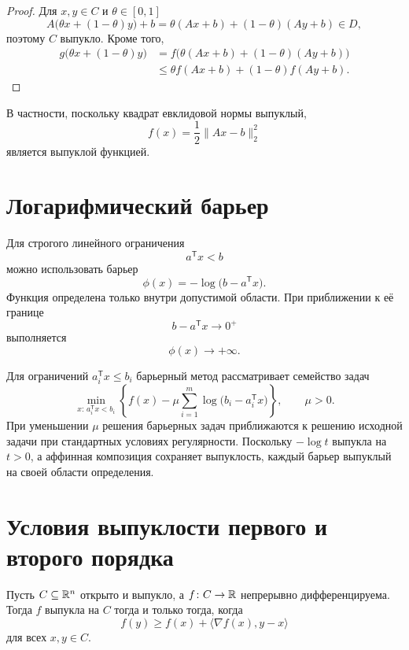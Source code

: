 \begin{proof}
Для \(x,y\in C\) и \(\theta\in[0,1]\)
\[
    A\bigl(\theta x+(1-\theta)y\bigr)+b
    =
    \theta(Ax+b)+(1-\theta)(Ay+b)\in D,
\]
поэтому \(C\) выпукло. Кроме того,
\[
\begin{aligned}
    g\bigl(\theta x+(1-\theta)y\bigr)
    &=
    f\bigl(
        \theta(Ax+b)+(1-\theta)(Ay+b)
    \bigr)
    \\
    &\le
    \theta f(Ax+b)+(1-\theta)f(Ay+b).
\end{aligned}
\]
\end{proof}

В частности, поскольку квадрат евклидовой нормы выпуклый,
\[
    f(x)=\frac12\lVert Ax-b\rVert_2^2
\]
является выпуклой функцией.

\section{Логарифмический барьер}

Для строгого линейного ограничения
\[
    a^{\mathsf T}x<b
\]
можно использовать барьер
\[
    \phi(x)
    =
    -\log\bigl(b-a^{\mathsf T}x\bigr).
\]
Функция определена только внутри допустимой области. При приближении
к её границе
\[
    b-a^{\mathsf T}x\to0^+
\]
выполняется
\[
    \phi(x)\to+\infty.
\]

Для ограничений \(a_i^{\mathsf T}x\le b_i\) барьерный метод
рассматривает семейство задач
\[
    \min_{x:\,a_i^{\mathsf T}x<b_i}
    \left\{
        f(x)
        -
        \mu
        \sum_{i=1}^{m}
        \log\bigl(b_i-a_i^{\mathsf T}x\bigr)
    \right\},
    \qquad
    \mu>0.
\]
При уменьшении \(\mu\) решения барьерных задач приближаются к решению
исходной задачи при стандартных условиях регулярности. Поскольку
\(-\log t\) выпукла на \(t>0\), а аффинная композиция сохраняет
выпуклость, каждый барьер выпуклый на своей области определения.

\section{Условия выпуклости первого и второго порядка}

\begin{theorem}
Пусть \(C\subseteq\mathbb{R}^n\) открыто и выпукло, а
\(f\colon C\to\mathbb{R}\) непрерывно дифференцируема. Тогда \(f\) выпукла
на \(C\) тогда и только тогда, когда
\[
    f(y)
    \ge
    f(x)
    +
    \langle\nabla f(x),y-x\rangle
\]
для всех \(x,y\in C\).
\end{theorem}

